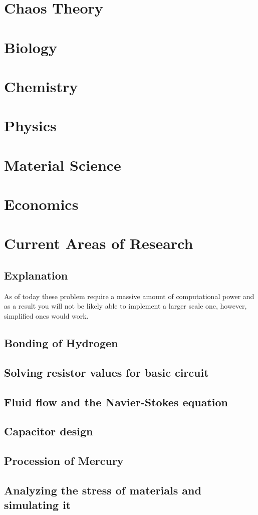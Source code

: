 \documentclass{article}
\begin{document}
\section{Chaos Theory}

\section{Biology}

\section{Chemistry}

\section{Physics}

\section{Material Science}

\section{Economics}

\section{Current Areas of Research}

\subsection{Explanation}
As of today these problem require a massive amount of computational power and as a result you will not be likely able to implement a larger scale one, however, simplified ones would work.

\subsection{Bonding of Hydrogen}

\subsection{Solving resistor values for basic circuit}

\subsection{Fluid flow and the Navier-Stokes equation}

\subsection{Capacitor design}

\subsection{Procession of Mercury}

\subsection{Analyzing the stress of materials and simulating it}
\end{document}

